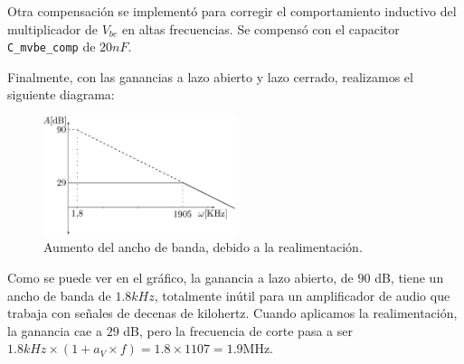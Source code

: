 Otra compensación se implementó para corregir el comportamiento inductivo del multiplicador de $V_{be}$ en altas frecuencias. Se compensó con el capacitor \texttt{C\_mvbe\_comp} de $20nF$.

Finalmente, con las ganancias a lazo abierto y lazo cerrado, realizamos el siguiente diagrama:

\begin{figure}[H]
	\centering
	\includegraphics[width=0.5\textwidth]{img/bodecompensado}
	\caption{Aumento del ancho de banda, debido a la realimentación.}
	\label{fig:bode-copmensado}
\end{figure}

Como se puede ver en el gráfico, la ganancia a lazo abierto, de $90$ dB, tiene un ancho de banda de $1.8kHz$, totalmente inútil para un amplificador de audio que trabaja con señales de decenas de kilohertz. Cuando aplicamos la realimentación, la ganancia cae a $29$ dB, pero la frecuencia de corte pasa a ser $1.8kHz \times (1 + a_V \times f) = 1.8 \times 1107 = 1.9 \mathrm{MHz}$.